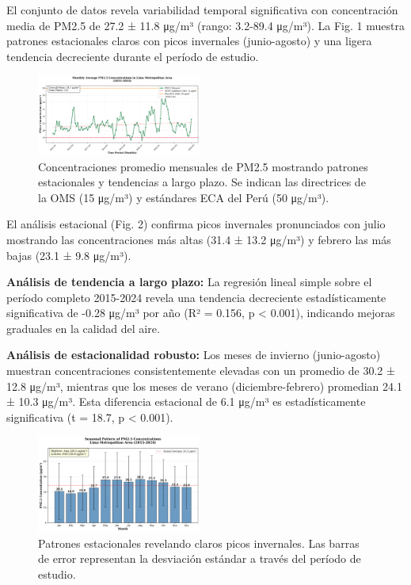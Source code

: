 \documentclass[conference]{IEEEtran}
\begin{document}
El conjunto de datos revela variabilidad temporal significativa con concentración media de PM2.5 de 27.2 ± 11.8 μg/m³ (rango: 3.2-89.4 μg/m³). La Fig. 1 muestra patrones estacionales claros con picos invernales (junio-agosto) y una ligera tendencia decreciente durante el período de estudio.

\begin{figure}[htbp]
\centerline{\includegraphics[width=0.48\textwidth]{Figura_1_Serie_Temporal_PM25.png}}
\caption{Concentraciones promedio mensuales de PM2.5 mostrando patrones estacionales y tendencias a largo plazo. Se indican las directrices de la OMS (15 μg/m³) y estándares ECA del Perú (50 μg/m³).}
\label{fig:temporal}
\end{figure}

El análisis estacional (Fig. 2) confirma picos invernales pronunciados con julio mostrando las concentraciones más altas (31.4 ± 13.2 μg/m³) y febrero las más bajas (23.1 ± 9.8 μg/m³).

\textbf{Análisis de tendencia a largo plazo:} La regresión lineal simple sobre el período completo 2015-2024 revela una tendencia decreciente estadísticamente significativa de -0.28 μg/m³ por año (R² = 0.156, p < 0.001), indicando mejoras graduales en la calidad del aire.

\textbf{Análisis de estacionalidad robusto:} Los meses de invierno (junio-agosto) muestran concentraciones consistentemente elevadas con un promedio de 30.2 ± 12.8 μg/m³, mientras que los meses de verano (diciembre-febrero) promedian 24.1 ± 10.3 μg/m³. Esta diferencia estacional de 6.1 μg/m³ es estadísticamente significativa (t = 18.7, p < 0.001).

\begin{figure}[htbp]
\centerline{\includegraphics[width=0.48\textwidth]{Figura_2_Patron_Estacional_PM25.png}}
\caption{Patrones estacionales revelando claros picos invernales. Las barras de error representan la desviación estándar a través del período de estudio.}
\label{fig:seasonal}
\end{figure}
\end{document}
